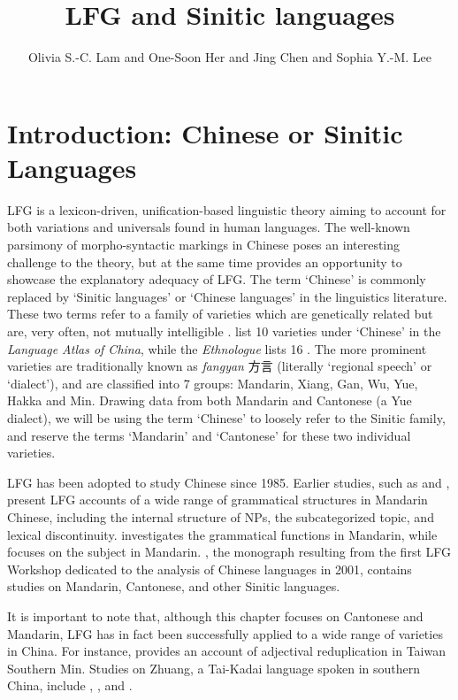 \documentclass[output=paper,chinesefont,hidelinks]{langscibook}
\title{LFG and Sinitic languages}
\author{Olivia S.-C. Lam\affiliation{University of Hong Kong}  and One-Soon Her\affiliation{Tunghai University \& National Chengchi University}  and Jing Chen\affiliation{The Hong Kong Polytechnic University}  and Sophia Y.-M. Lee\affiliation{The Hong Kong Polytechnic University}}
\begin{document}
\maketitle
\label{chap:Sinitic}


\section{Introduction: Chinese or Sinitic Languages}
\label{sec:Sinitic:1}

LFG is a lexicon-driven, unification-based linguistic theory aiming to account for both variations and universals found in human languages. The well-known parsimony of morpho-syntactic markings in Chinese poses an interesting challenge to the theory, but at the same time provides an opportunity to showcase the explanatory adequacy of LFG. The term `Chinese' is commonly replaced by `Sinitic languages' or `Chinese languages' in the linguistics literature. These two terms refer to a family of varieties which are genetically related but are, very often, not mutually intelligible \citep{Handel2015,HuangShi2016}. \citet{WurmLiu1987} list 10 varieties under `Chinese' in the \textit{Language Atlas of China}, while the \textit{Ethnologue} lists 16 \citep{Simons2020}. The more prominent varieties are traditionally known as \textit{fangyan} {\cn 方言} (literally `regional speech' or `dialect'), and are classified into 7 groups: Mandarin, Xiang, Gan, Wu, Yue, Hakka and Min. Drawing data from both Mandarin and Cantonese (a Yue dialect), we will be using the term `Chinese' to loosely refer to the Sinitic family, and reserve the terms `Mandarin' and `Cantonese' for these two individual varieties.

LFG has been adopted to study Chinese since 1985. Earlier studies, such as \citet{Huang1985,Huang1986,Huang1987,Huang1988,Huang1989a,Huang1989b,Huang1990} and \citet{HuangMangione1985}, pre\-sent LFG accounts of a wide range of grammatical structures in Mandarin Chinese, including the internal structure of NPs, the subcategorized topic, and lexical discontinuity. \citet{Her1990} investigates the grammatical functions in Mandarin, while \citet{Tan1991} focuses on the subject in Mandarin. \citet{BodomoLuke2003}, the monograph resulting from the first LFG Workshop dedicated to the analysis of Chinese languages in 2001, contains studies on Mandarin, Cantonese, and other Sinitic languages.

It is important to note that, although this chapter focuses on Cantonese and Mandarin, LFG has in fact been successfully applied to a wide range of varieties in China. For instance, \citet{Huang1991} provides an account of adjectival reduplication in Taiwan Southern Min. Studies on Zhuang, a Tai-Kadai language spoken in southern China, include \citet{Pan2010}, \citet{Bodomo2011}, and \citet{BurusphatQin2012}.
\end{document}
